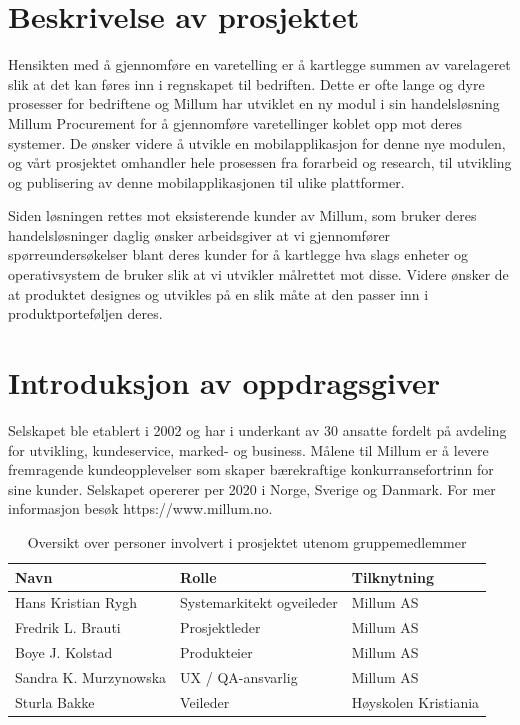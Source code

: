 \section{\textbf{Beskrivelse av prosjektet}}
 Hensikten med å gjennomføre en varetelling er å kartlegge summen av varelageret slik at det kan føres inn i regnskapet til bedriften. Dette er ofte lange og dyre prosesser for bedriftene og Millum har utviklet en ny modul i sin handelsløsning Millum Procurement for å gjennomføre varetellinger koblet opp mot deres systemer. De ønsker videre å utvikle en mobilapplikasjon for denne nye modulen, og vårt prosjektet omhandler hele prosessen fra forarbeid og research, til utvikling og publisering av denne mobilapplikasjonen til ulike plattformer.

Siden løsningen rettes mot eksisterende kunder av Millum, som bruker deres handelsløsninger daglig ønsker arbeidsgiver at vi gjennomfører spørreundersøkelser blant deres kunder for å kartlegge hva slags enheter og operativsystem de bruker slik at vi utvikler målrettet mot disse. Videre ønsker de at produktet designes og utvikles på en slik måte at den passer inn i produktporteføljen deres.


\section{\textbf{Introduksjon av oppdragsgiver}}
 Selskapet ble etablert i 2002 og har i underkant av 30 ansatte fordelt på avdeling for utvikling, kundeservice, marked- og business. Målene til Millum er å levere fremragende kundeopplevelser som skaper bærekraftige konkurransefortrinn for sine kunder. Selskapet opererer per 2020 i Norge, Sverige og Danmark. For mer informasjon besøk https://www.millum.no.

\begin{table}[htbp]
  \centering
  \caption{Oversikt over personer involvert i prosjektet utenom gruppemedlemmer}
    \begin{tabular}{|l|l|p{17.355em}|}
    \toprule
    Navn & Rolle & Tilknytning \\
    \midrule
    \multicolumn{1}{|p{6.43em}|}{Hans Kristian \newline{}Rygh} & \multicolumn{1}{p{7.215em}|}{Systemarkitekt og\newline{}veileder} & Millum AS \\
    \midrule
    Fredrik L. Brauti & Prosjektleder & Millum AS \\
    \midrule
    Boye J. Kolstad & Produkteier & Millum AS \\
    \midrule
    Sandra K. Murzynowska & UX / QA-ansvarlig & Millum AS \\
    \midrule
    Sturla Bakke & Veileder & Høyskolen Kristiania \\
    \bottomrule
    \end{tabular}%
  \label{tab:addlabel}%
\end{table}%

